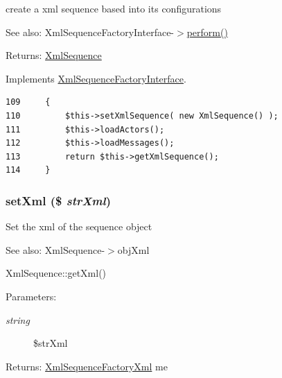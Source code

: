 create a xml sequence based into its configurations

\begin{Desc}
\item[See also:]XmlSequenceFactoryInterface-$>$\hyperlink{class_xml_sequence_factory_xml_469121070b5e6118f202517380558019}{perform()} \end{Desc}
\begin{Desc}
\item[Returns:]\hyperlink{class_xml_sequence}{XmlSequence} \end{Desc}


Implements \hyperlink{interface_xml_sequence_factory_interface_469121070b5e6118f202517380558019}{XmlSequenceFactoryInterface}.

\begin{Code}\begin{verbatim}109     {
110         $this->setXmlSequence( new XmlSequence() );
111         $this->loadActors();
112         $this->loadMessages();
113         return $this->getXmlSequence();
114     }
\end{verbatim}
\end{Code}


\hypertarget{class_xml_sequence_factory_xml_8ac34bd040fb3627c7b4ca12808d427f}{
\subsubsection[{setXml}]{\setlength{\rightskip}{0pt plus 5cm}setXml (\$ {\em strXml})}}
\label{class_xml_sequence_factory_xml_8ac34bd040fb3627c7b4ca12808d427f}


Set the xml of the sequence object

\begin{Desc}
\item[See also:]XmlSequence-$>$objXml 

XmlSequence::getXml() \end{Desc}
\begin{Desc}
\item[Parameters:]
\begin{description}
\item[{\em string}]\$strXml \end{description}
\end{Desc}
\begin{Desc}
\item[Returns:]\hyperlink{class_xml_sequence_factory_xml}{XmlSequenceFactoryXml} me \end{Desc}


